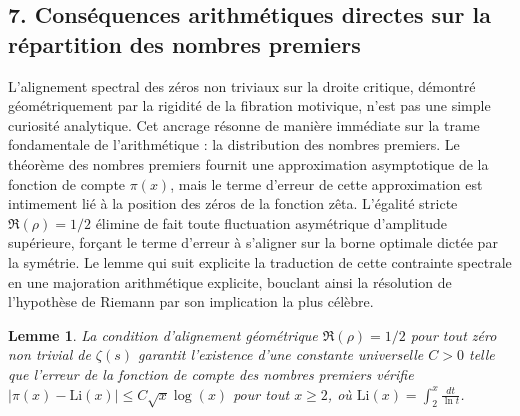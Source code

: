 \documentclass[
]{article}
\newtheorem{lemma}{Lemme}
\begin{document}
\hypertarget{consequences-arithmetiques-directes-sur-la-repartition-des-nombres-premiers}{%
\subsection{7. Conséquences arithmétiques directes sur la répartition des nombres premiers}\label{consequences-arithmetiques-directes-sur-la-repartition-des-nombres-premiers}}

L'alignement spectral des zéros non triviaux sur la droite critique, démontré géométriquement par la rigidité de la fibration motivique, n'est pas une simple curiosité analytique. Cet ancrage résonne de manière immédiate sur la trame fondamentale de l'arithmétique : la distribution des nombres premiers. Le théorème des nombres premiers fournit une approximation asymptotique de la fonction de compte $\pi(x)$, mais le terme d'erreur de cette approximation est intimement lié à la position des zéros de la fonction zêta. L'égalité stricte $\Re(\rho) = 1/2$ élimine de fait toute fluctuation asymétrique d'amplitude supérieure, forçant le terme d'erreur à s'aligner sur la borne optimale dictée par la symétrie. Le lemme qui suit explicite la traduction de cette contrainte spectrale en une majoration arithmétique explicite, bouclant ainsi la résolution de l'hypothèse de Riemann par son implication la plus célèbre.

\begin{lemma}
La condition d'alignement géométrique $\Re(\rho) = 1/2$ pour tout zéro non trivial de $\zeta(s)$ garantit l'existence d'une constante universelle $C > 0$ telle que l'erreur de la fonction de compte des nombres premiers vérifie $\left| \pi(x) - \mathrm{Li}(x) \right| \le C \sqrt{x} \log(x)$ pour tout $x \ge 2$, où $\mathrm{Li}(x) = \int_2^x \frac{dt}{\ln t}$.
\end{lemma}
\end{document}

